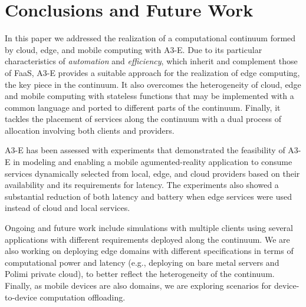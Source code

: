 \section{Conclusions and Future Work}\label{sec:conclusions}

In this paper we addressed the realization of a computational continuum formed by cloud, edge, and mobile computing with A3-E. Due to its particular characteristics of \textit{automation} and \textit{efficiency}, which inherit and complement those of FaaS, A3-E provides a suitable approach for the realization of edge computing, the key piece in the continuum. It also overcomes the heterogeneity of cloud, edge and mobile computing with stateless functions that may be implemented with a common language and ported to different parts of the continuum. Finally, it tackles the placement of services along the continuum with a dual process of allocation involving both clients and providers.

A3-E has been assessed with experiments that demonstrated the feasibility of A3-E in modeling and enabling a mobile agumented-reality application to consume services dynamically selected from local, edge, and cloud providers based on their availability and its requirements for latency. The experiments also showed a substantial reduction of both latency and battery when edge services were used instead of cloud and local services. 

Ongoing and future work include simulations with multiple clients using several applications with different requirements deployed along the continuum. We are also working on deploying edge domains with different specifications in terms of computational power and latency (e.g., deploying on bare metal servers and Polimi private cloud), to better reflect the heterogeneity of the continuum. Finally, as mobile devices are also domains, we are exploring scenarios for device-to-device computation offloading.


 